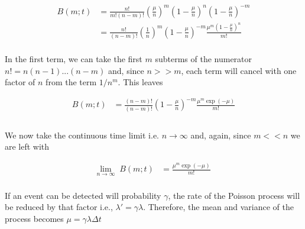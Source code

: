 \documentclass{ucetd}
\begin{document}
\begin{align*}
B(m;t) &= \frac{n!}{m!(n-m)!}\left(\frac{\mu}{n}\right)^{m}\left(1-\frac{\mu}{n}\right)^{n}\left(1-\frac{\mu}{n}\right)^{-m}\\
&= \frac{n!}{(n-m)!}\left(\frac{1}{n}\right)^{m}\left(1-\frac{\mu}{n}\right)^{-m}\frac{\mu^{m}\left(1-\frac{\mu}{n}\right)^{n}}{m!}\\
\end{align*}

In the first term, we can take the first $m$ subterms of the numerator $n! = n(n-1)...(n-m)$ and, since $n>>m$, each term will cancel with one factor of $n$ from the term $1/n^{m}$. This leaves

\begin{align*}
B(m;t) &= \frac{(n-m)!}{(n-m)!}\left(1-\frac{\mu}{n}\right)^{-m}\frac{\mu^{m}\exp(-\mu)}{m!}\\\\
\end{align*}

We now take the continuous time limit i.e. $n\rightarrow\infty$ and, again, since $m << n$ we are left with 

\begin{align*}
\underset{n\rightarrow\infty}{\mathrm{lim}} \;\; B(m;t) &= \frac{\mu^{m}\exp(-\mu)}{m!}\\
\end{align*}

If an event can be detected will probability $\gamma$, the rate of the Poisson process will be reduced by that factor i.e., $\lambda' = \gamma\lambda$. Therefore, the mean and variance of the process becomes $\mu = \gamma\lambda\Delta t$
\end{document}
